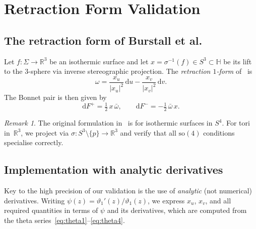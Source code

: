 \documentclass[11pt,a4paper]{article}
\theoremstyle{plain}
\theoremstyle{definition}
\theoremstyle{remark}
\newtheorem{remark}[theorem]{Remark}
\newcommand{\vt}[1]{\vartheta_{#1}}     %
\newcommand{\RR}{\mathbb{R}}
\newcommand{\HH}{\mathbb{H}}            %
\newcommand{\dd}{\mathrm{d}}
\newcommand{\abs}[1]{\lvert #1 \rvert}
\begin{document}
\section{Retraction Form Validation}\label{sec:retraction}

\subsection{The retraction form of Burstall et al.}
\label{sec:retraction-theory}
Let $f \colon \Sigma \to \RR^3$ be an isothermic surface and let
$x = \sigma^{-1}(f) \in S^3 \subset \HH$ be its lift to the
$3$-sphere via inverse stereographic projection.  The
\emph{retraction $1$-form} of~\cite{BCHR25} is
\begin{equation}
  \omega = \frac{x_u}{\abs{x_u}^2}\,\dd u
    - \frac{x_v}{\abs{x_v}^2}\,\dd v.
  \label{eq:omega}
\end{equation}
The Bonnet pair is then given by
\begin{equation}
  \dd F^+ = \tfrac12\,x\,\bar\omega,
  \qquad
  \dd F^- = -\tfrac12\,\bar{\omega}\,x.
  \label{eq:Fpm}
\end{equation}

\begin{remark}
  The original formulation in~\cite{BCHR25} is for isothermic
  surfaces in $S^4$.  For tori in~$\RR^3$, we project via
  $\sigma \colon S^3 \setminus \{p\} \to \RR^3$ and verify that
  all $\mathrm{so}(4)$ conditions specialise correctly.
\end{remark}

\subsection{Implementation with analytic derivatives}
\label{sec:retraction-impl}
Key to the high precision of our validation is the use of
\emph{analytic} (not numerical) derivatives.  Writing
$\psi(z) = \vt{1}'(z)/\vt{1}(z)$, we express $x_u$, $x_v$, and all
required quantities in terms of $\psi$ and its derivatives, which are
computed from the theta series~\eqref{eq:theta1}--\eqref{eq:theta4}.
\end{document}

